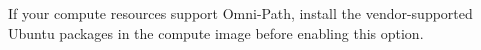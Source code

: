 If your compute resources support Omni-Path, install the vendor-supported Ubuntu
packages in the compute image before enabling this option.
